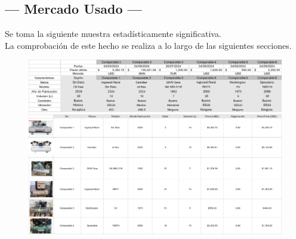 \subsection{\centering --- Mercado Usado ---} %
Se toma la siguiente muestra estadísticamente significativa. \\ 
La comprobación de este hecho se realiza a lo largo de las siguientes secciones.
\begin{figure}[hbtp!]
	\centering
\includegraphics[width=  \linewidth, page = 1]{../0.imagenes/CAP_8/mercado_4_1}
\includegraphics[width=  \linewidth, page = 1]{../0.imagenes/CAP_8/mercado_4_2}
\end{figure}

